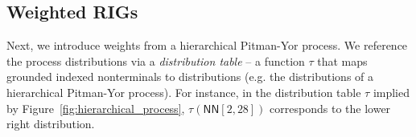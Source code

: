 \documentclass[11pt]{article}
\renewcommand{\bnfpn}[1]{\mathsf{#1}}
\renewcommand{\bnfpo}{\rightarrow}
\begin{document}




\subsection{Weighted RIGs}

Next, we introduce weights from a hierarchical Pitman-Yor process. We reference the process distributions via a \emph{distribution table} -- a function $\tau$ that maps grounded indexed nonterminals to distributions (e.g. the distributions of a hierarchical Pitman-Yor process). For instance, in the distribution table $\tau$ implied by Figure~\ref{fig:hierarchical_process}, $\tau(\mathsf{NN}[2,28])$ corresponds to the lower right distribution.
\end{document}
